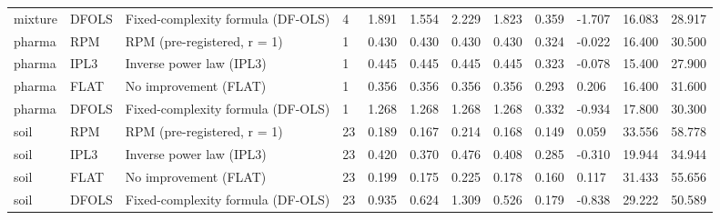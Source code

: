 \begin{tabular}{llllllllllll}
mixture & DFOLS & Fixed-complexity formula (DF-OLS) & 4 & 1.891 & 1.554 & 2.229 & 1.823 & 0.359 & -1.707 & 16.083 & 28.917 \\
pharma & RPM & RPM (pre-registered, r = 1) & 1 & 0.430 & 0.430 & 0.430 & 0.430 & 0.324 & -0.022 & 16.400 & 30.500 \\
pharma & IPL3 & Inverse power law (IPL3) & 1 & 0.445 & 0.445 & 0.445 & 0.445 & 0.323 & -0.078 & 15.400 & 27.900 \\
pharma & FLAT & No improvement (FLAT) & 1 & 0.356 & 0.356 & 0.356 & 0.356 & 0.293 & 0.206 & 16.400 & 31.600 \\
pharma & DFOLS & Fixed-complexity formula (DF-OLS) & 1 & 1.268 & 1.268 & 1.268 & 1.268 & 0.332 & -0.934 & 17.800 & 30.300 \\
soil & RPM & RPM (pre-registered, r = 1) & 23 & 0.189 & 0.167 & 0.214 & 0.168 & 0.149 & 0.059 & 33.556 & 58.778 \\
soil & IPL3 & Inverse power law (IPL3) & 23 & 0.420 & 0.370 & 0.476 & 0.408 & 0.285 & -0.310 & 19.944 & 34.944 \\
soil & FLAT & No improvement (FLAT) & 23 & 0.199 & 0.175 & 0.225 & 0.178 & 0.160 & 0.117 & 31.433 & 55.656 \\
soil & DFOLS & Fixed-complexity formula (DF-OLS) & 23 & 0.935 & 0.624 & 1.309 & 0.526 & 0.179 & -0.838 & 29.222 & 50.589 \\
\hline
\end{tabular}
